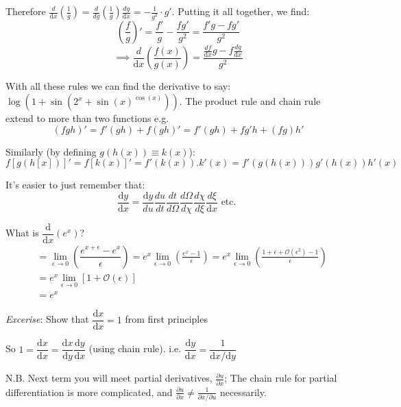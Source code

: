 \documentclass[10pt]{scrartcl}
\begin{document}
Therefore $\frac{d}{\mathrm{d}x}\left(\frac{1}{g}\right) = \frac{d}{dg}\left(\frac{1}{g}\right)\frac{dg}{\mathrm{d}x} 
  = -\frac{1}{g^2}\cdot g'$. Putting it all together, we find:
\[ \left(\frac{f}{g}\right)' = \frac{f'}{g} - \frac{fg'}{g^2}=  \frac{f'g - fg'}{g^2}\]
\[\implies\boxed{\frac{d}{\mathrm{d}x}\left(\frac{f(x)}{g(x)}\right) = \frac{\frac{df}{\mathrm{d}x}g - f\frac{dg}{\mathrm{d}x}}{g^2}}\]

With all these rules we can find the derivative to say: $\log(1 + \sin(2^x + \sin(x)^{\cos(x)}))$. The product rule and chain rule extend to more than two functions e.g. 
\[(fgh)' = f'(gh) + f(gh)' = f'(gh) + fg'h + (fg)h'\]

Similarly (by defining $g(h(x)) \equiv k(x)$):\\
 \[f[g(h[x])]' = f[k(x)]' = f'(k(x)).k'(x) = f'(g(h(x)))g'(h(x))h'(x)\]
 
 It's easier to just remember that:
 \[\displaystyle{
 \frac{\mathrm{d}y}{\mathrm{d}x} = 
 \frac{\mathrm{d}y}{du}
 \frac{du}{dt}
 \frac{dt}{d\Omega}
 \frac{d\Omega}{d\chi}
 \frac{d\chi}{d\xi}
 \frac{d\xi}{\mathrm{d}x}   
 } \text{ etc. }\]\vspace*{5pt}


\begin{example}
What is $\dfrac{\mathrm{d}}{\mathrm{d}x} (e^x)$?
\[
\begin{aligned}
&= 
\lim_{\epsilon \to 0} 
\left(\dfrac{e^{x + \epsilon} - e^x}{\epsilon}\right) 
= e^x \lim_{\epsilon \to 0}
\left(\frac{e^x - 1}{\epsilon}\right) 
= e^x \lim_{\epsilon \to 0} 
\left(\frac{1 + \epsilon + \mathcal{O}(\epsilon ^2) -1}{\epsilon} \right) \\
&= e^x \lim_{\epsilon \to 0} 
[1 + \mathcal{O}(\epsilon)]\\
& = e^x
\end{aligned}
\]
\end{example}

\emph{Excerise}: Show that $\dfrac{\mathrm{d}x}{\mathrm{d}x} = 1$ from first principles

So $1 = \dfrac{\mathrm{d}x}{\mathrm{d}x} = \dfrac{\mathrm{d}x}{\mathrm{d}y}\dfrac{\mathrm{d}y}{\mathrm{d}x}$ (using chain rule). i.e. $\boxed{\dfrac{\mathrm{d}y}{\mathrm{d}x} = \dfrac{1}{\mathrm{d}x/\mathrm{d}y}}$


N.B. Next term you will meet partial derivatives, $\frac{\partial u}{\partial x}$; The chain rule for partial differentiation is more complicated, and $\frac{\partial u}{\partial x} \neq \frac{1}{\partial x / \partial u}$ necessarily.\\
\end{document}
